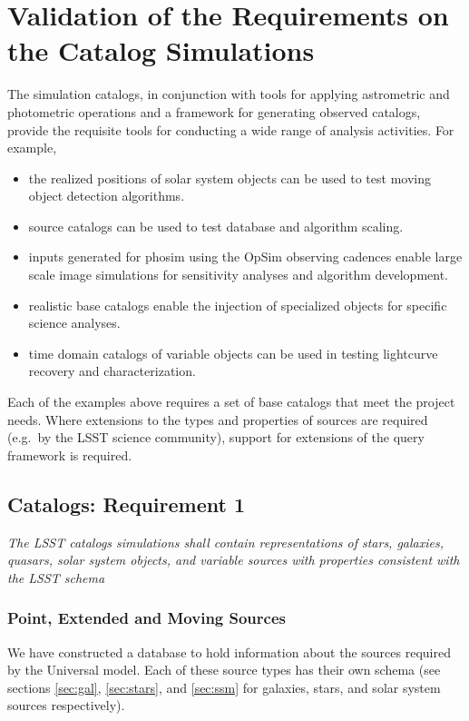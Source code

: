 \documentclass[]{article}
\begin{document}
{\section{Validation of the Requirements on the Catalog Simulations}

The simulation catalogs, in conjunction with tools for applying
astrometric and photometric operations and a framework for generating
observed catalogs, provide the requisite tools for conducting a
wide range of analysis activities. For example,
\begin{itemize}
\item the realized positions of solar system objects can be used to
  test moving object detection algorithms.
\item source catalogs can be used to test database and algorithm scaling.
\item inputs generated for phosim using the OpSim observing cadences
  enable large scale image simulations for sensitivity analyses and
  algorithm development.
\item realistic base catalogs enable the injection of specialized objects for specific science
analyses.
\item time domain catalogs of variable objects can be used in testing
  lightcurve recovery and characterization.
\end{itemize}

Each of the examples above requires a set of base catalogs that meet
the project needs.  Where extensions to the types and properties of
sources are required (e.g.\ by the LSST science community), support for
extensions of the query framework is required.

\subsection{Catalogs: Requirement 1}

{\it The LSST catalogs simulations shall contain representations of
  stars, galaxies, quasars, solar system objects, and variable sources
  with properties consistent with the LSST schema}

\subsubsection{Point, Extended and Moving Sources}

We have constructed a database to hold information about the sources
required by the Universal model.  Each of these source types has their
own schema (see sections \ref{sec:gal}, \ref{sec:stars}, and
\ref{sec:ssm} for galaxies, stars, and solar system sources
respectively).

}
\end{document}
